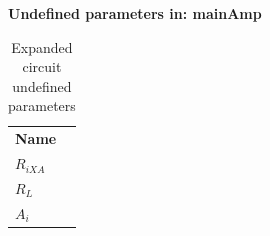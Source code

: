 {\textbf{Undefined parameters in: mainAmp}}

\begin{table}[h]
\centering
\begin{tabular}[c]{l}
\textbf{Name} \\ 
\rowcolor{myyellow}
$R_{i XA}$ \\ 
$R_{L}$ \\ 
\rowcolor{myyellow}
$A_{i}$ \\ 
\end{tabular}
\caption{Expanded circuit undefined parameters}
\end{table}

